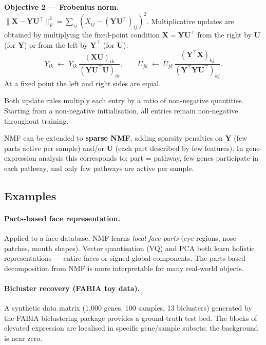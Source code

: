 \documentclass[11pt, oneside]{book}
\newcommand{\T}{^{\top}}
\begin{document}
\textbf{Objective 2 — Frobenius norm.}
$\|\bm{X}-\bm{Y}\bm{U}\T\|_F^2 = \sum_{ij}(X_{ij}-(\bm{Y}\bm{U}\T)_{ij})^2$.
Multiplicative updates are obtained by multiplying the
fixed-point condition $\bm{X}=\bm{Y}\bm{U}\T$ from the right by $\bm{U}$
(for $\bm{Y}$) or from the left by $\bm{Y}\T$ (for $\bm{U}$):
\[
  Y_{ik} \;\leftarrow\; Y_{ik}\,
    \frac{(\bm{X}\bm{U})_{ik}}{(\bm{Y}\bm{U}\T\bm{U})_{ik}},
  \qquad
  U_{jk} \;\leftarrow\; U_{jk}\,
    \frac{(\bm{Y}\T\bm{X})_{kj}}{(\bm{Y}\T\bm{Y}\bm{U}\T)_{kj}}.
\]
At a fixed point the left and right sides are equal.

\begin{intbox}[title={Why multiplicative updates preserve non-negativity}]
Both update rules multiply each entry by a ratio of non-negative quantities.
Starting from a non-negative initialisation, all entries remain non-negative
throughout training.
\end{intbox}

NMF can be extended to \textbf{sparse NMF}, adding sparsity penalties on
$\bm{Y}$ (few parts active per sample) and/or $\bm{U}$ (each part described
by few features).
In gene-expression analysis this corresponds to: part = pathway, few genes
participate in each pathway, and only few pathways are active per sample.

\subsection{Examples}

\paragraph{Parts-based face representation.}
Applied to a face database, NMF learns \emph{local face parts} (eye regions,
nose patches, mouth shapes).
Vector quantisation (VQ) and PCA both learn holistic representations — entire
faces or signed global components.
The parts-based decomposition from NMF is more interpretable for many
real-world objects.

\paragraph{Bicluster recovery (FABIA toy data).}
A synthetic data matrix (1{,}000 genes, 100 samples, 13 biclusters) generated
by the FABIA biclustering package provides a ground-truth test bed.
The blocks of elevated expression are localised in specific gene/sample
subsets; the background is near zero.
\end{document}
